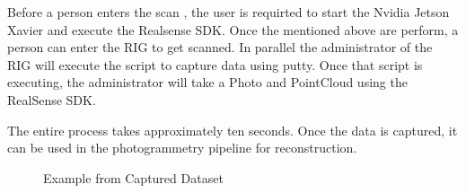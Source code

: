 \documentclass[12pt]{report}
\begin{document}
Before a person enters the scan , the user is requirted to start the Nvidia Jetson Xavier and execute the Realsense SDK.
Once the mentioned above are perform, a person can enter the RIG to get scanned.
In parallel the administrator of the RIG will execute the script to capture data using putty. Once that script is executing, the administrator will take a Photo and PointCloud
using the RealSense SDK. 

The entire process takes approximately ten seconds. Once the data is captured, it can be used in the photogrammetry pipeline for reconstruction.
\enlargethispage{\baselineskip}
\begin{figure}[H]
  \centering
  \qquad
  \qquad
  \qquad
  \qquad
  \caption{Example from Captured Dataset}
  \label{fig:examples}
\end{figure}
\end{document}
